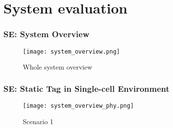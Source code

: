 \documentclass[10pt]{beamer}
\begin{document}
\section{System evaluation}

\begin{frame}
    \frametitle{SE: System Overview}
    \begin{figure}[H]
        \centering
        \texttt{[image: system\_overview.png]}
        \caption{Whole system overview}
        \label{fig:system_overview}
    \end{figure}
\end{frame}

\begin{frame}
    \frametitle{SE: Static Tag in Single-cell Environment}
    \begin{figure}[H]
        \centering
        \texttt{[image: system\_overview\_phy.png]}
        \caption{Scenario 1}
        \label{fig:scenario_1}
    \end{figure}
\end{frame}
\end{document}
